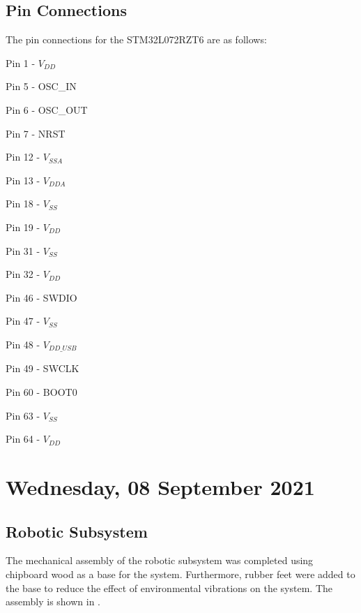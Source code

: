 \subsection{Pin Connections}

The pin connections for the STM32L072RZT6 are as follows:

\begin{compactitem}
	\item Pin 1 - $V_{DD}$
	\item Pin 5 - OSC\_IN
	\item Pin 6 - OSC\_OUT
	\item Pin 7 - NRST
	\item Pin 12 - $V_{SSA}$
	\item Pin 13 - $V_{DDA}$
	\item Pin 18 - $V_{SS}$
	\item Pin 19 - $V_{DD}$
	\item Pin 31 - $V_{SS}$
	\item Pin 32 - $V_{DD}$
	\item Pin 46 - SWDIO
	\item Pin 47 - $V_{SS}$
	\item Pin 48 - $V_{DD\_USB}$
	\item Pin 49 - SWCLK
	\item Pin 60 - BOOT0
	\item Pin 63 - $V_{SS}$
	\item Pin 64 - $V_{DD}$
\end{compactitem}

\pendsign

\section[2021/09/08]{Wednesday, 08 September 2021}

\subsection{Robotic Subsystem}

The mechanical assembly of the robotic subsystem was completed using chipboard wood as a base for the system. Furthermore, rubber feet were added to the base to reduce the effect of environmental vibrations on the system. The assembly is shown in .


